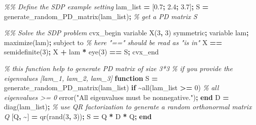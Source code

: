 \documentclass[
]{book}
\newenvironment{Shaded}{\begin{snugshade}}{\end{snugshade}}
\newcommand{\CommentTok}[1]{\textcolor[rgb]{0.56,0.35,0.01}{\textit{#1}}}
\newcommand{\FloatTok}[1]{\textcolor[rgb]{0.00,0.00,0.81}{#1}}
\newcommand{\KeywordTok}[1]{\textcolor[rgb]{0.13,0.29,0.53}{\textbf{#1}}}
\newcommand{\NormalTok}[1]{#1}
\newcommand{\OperatorTok}[1]{\textcolor[rgb]{0.81,0.36,0.00}{\textbf{#1}}}
\newcommand{\StringTok}[1]{\textcolor[rgb]{0.31,0.60,0.02}{#1}}
\newcommand{\VariableTok}[1]{\textcolor[rgb]{0.00,0.00,0.00}{#1}}
\theoremstyle{definition}
\theoremstyle{definition}
\theoremstyle{definition}
\theoremstyle{definition}
\theoremstyle{remark}
\begin{document}
\begin{Shaded}
\begin{Highlighting}[]
\CommentTok{\%\% Define the SDP example setting}
\VariableTok{lam\_list} \OperatorTok{=}\NormalTok{ [}\FloatTok{0.7}\OperatorTok{;} \FloatTok{2.4}\OperatorTok{;} \FloatTok{3.7}\NormalTok{]}\OperatorTok{;}
\VariableTok{S} \OperatorTok{=} \VariableTok{generate\_random\_PD\_matrix}\NormalTok{(}\VariableTok{lam\_list}\NormalTok{)}\OperatorTok{;} \CommentTok{\% get a PD matrix S}

\CommentTok{\%\% Solve the SDP problem}
\VariableTok{cvx\_begin}
    \VariableTok{variable} \VariableTok{X}\NormalTok{(}\FloatTok{3}\OperatorTok{,} \FloatTok{3}\NormalTok{) }\VariableTok{symmetric}\OperatorTok{;}
    \VariableTok{variable} \VariableTok{lam}\OperatorTok{;} 
    \VariableTok{maximize}\NormalTok{(}\VariableTok{lam}\NormalTok{)}\OperatorTok{;} 
    \VariableTok{subject} \VariableTok{to}
        \CommentTok{\% here "==" should be read as "is in"}
        \VariableTok{X} \OperatorTok{==} \VariableTok{semidefinite}\NormalTok{(}\FloatTok{3}\NormalTok{)}\OperatorTok{;} 
        \VariableTok{X} \OperatorTok{+} \VariableTok{lam} \OperatorTok{*} \VariableTok{eye}\NormalTok{(}\FloatTok{3}\NormalTok{) }\OperatorTok{==} \VariableTok{S}\OperatorTok{;}
\VariableTok{cvx\_end}

\CommentTok{\% this function help to generate PD matrix of size 3*3 }
\CommentTok{\% if you provide the eigenvalues [lam\_1, lam\_2, lam\_3]}
\KeywordTok{function} \VariableTok{S} \OperatorTok{=} \VariableTok{generate\_random\_PD\_matrix}\NormalTok{(}\VariableTok{lam\_list}\NormalTok{)}
    \KeywordTok{if} \OperatorTok{\textasciitilde{}}\VariableTok{all}\NormalTok{(}\VariableTok{lam\_list} \OperatorTok{\textgreater{}=} \FloatTok{0}\NormalTok{) }\CommentTok{\% all eigenvalues \textgreater{}= 0}
        \VariableTok{error}\NormalTok{(}\StringTok{"All eigenvalues must be nonnegative."}\NormalTok{)}\OperatorTok{;}
    \KeywordTok{end}
    \VariableTok{D} \OperatorTok{=} \VariableTok{diag}\NormalTok{(}\VariableTok{lam\_list}\NormalTok{)}\OperatorTok{;}
    \CommentTok{\% use QR factorization to generate a random orthonormal matrix Q}
\NormalTok{    [}\VariableTok{Q}\OperatorTok{,} \OperatorTok{\textasciitilde{}}\NormalTok{] }\OperatorTok{=} \VariableTok{qr}\NormalTok{(}\VariableTok{rand}\NormalTok{(}\FloatTok{3}\OperatorTok{,} \FloatTok{3}\NormalTok{))}\OperatorTok{;}
    \VariableTok{S} \OperatorTok{=}  \VariableTok{Q} \OperatorTok{*} \VariableTok{D} \OperatorTok{*} \VariableTok{Q}\OperatorTok{\textquotesingle{};}
\KeywordTok{end}
\end{Highlighting}
\end{Shaded}
\end{document}
